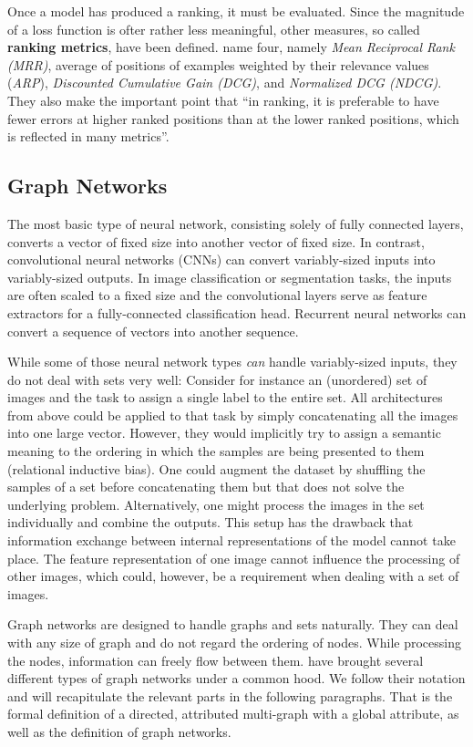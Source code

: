 Once a model has produced a ranking, it must be evaluated. Since the magnitude of a loss function is ofter rather less meaningful, other measures, so called \textbf{ranking metrics}, have been defined. \cite{tfranking} name four, namely \textit{Mean Reciprocal Rank (MRR)}, average of positions of examples weighted by their relevance values (\textit{ARP}), \textit{Discounted Cumulative Gain (DCG)}, and \textit{Normalized DCG (NDCG)}. They also make the important point that ``in ranking, it is preferable to have fewer errors at higher ranked positions than at the lower ranked positions, which is reflected in many metrics''.

\subsection{Graph Networks}
\label{sec:graphnetworks}

The most basic type of neural network, consisting solely of fully connected layers, converts a vector of fixed size into another vector of fixed size.
In contrast, convolutional neural networks (CNNs) can convert variably-sized inputs into variably-sized outputs. In image classification or segmentation tasks, the inputs are often scaled to a fixed size and the convolutional layers serve as feature extractors for a fully-connected classification head.
Recurrent neural networks can convert a sequence of vectors into another sequence.

While some of those neural network types \textit{can} handle variably-sized inputs, they do not deal with sets very well: Consider for instance an (unordered) set of images and the task to assign a single label to the entire set. All architectures from above could be applied to that task by simply concatenating all the images into one large vector. However, they would implicitly try to assign a semantic meaning to the ordering in which the samples are being presented to them (relational inductive bias). One could augment the dataset by shuffling the samples of a set before concatenating them but that does not solve the underlying problem. Alternatively, one might process the images in the set individually and combine the outputs. This setup has the drawback that information exchange between internal representations of the model cannot take place. The feature representation of one image cannot influence the processing of other images, which could, however, be a requirement when dealing with a set of images.

Graph networks are designed to handle graphs and sets naturally. They can deal with any size of graph and do not regard the ordering of nodes. While processing the nodes, information can freely flow between them. \cite{deepmind:graphnets} have brought several different types of graph networks under a common hood. We follow their notation and will recapitulate the relevant parts in the following paragraphs. That is the formal definition of a directed, attributed multi-graph with a global attribute, as well as the definition of graph networks.

